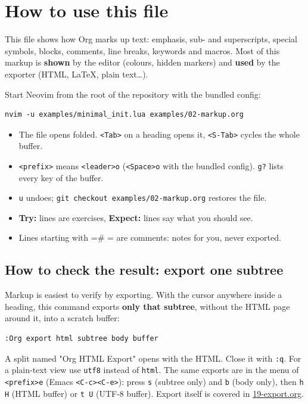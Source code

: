 \section{How to use this file}
\label{sec:orgba55d0f}
This file shows how Org marks up text: emphasis, sub- and superscripts,
special symbols, blocks, comments, line breaks, keywords and macros. Most of
this markup is \textbf{shown} by the editor (colours, hidden markers) and \textbf{used}
by the exporter (HTML, \LaTeX{}, plain text\ldots{}).

Start Neovim from the root of the repository with the bundled config:

\begin{verbatim}
nvim -u examples/minimal_init.lua examples/02-markup.org
\end{verbatim}

\begin{itemize}
\item The file opens folded. \texttt{<Tab>} on a heading opens it, \texttt{<S-Tab>} cycles
the whole buffer.
\item \texttt{<prefix>} means \texttt{<leader>o} (\texttt{<Space>o} with the bundled config). \texttt{g?}
lists every key of the buffer.
\item \texttt{u} undoes; \texttt{git checkout examples/02-markup.org} restores the file.
\item \textbf{Try:} lines are exercises, \textbf{Expect:} lines say what you should see.
\item Lines starting with =\# = are comments: notes for you, never exported.
\end{itemize}
\subsection{How to check the result: export one subtree}
\label{sec:org3ef3b96}
Markup is easiest to verify by exporting. With the cursor anywhere inside a
heading, this command exports \textbf{only that subtree}, without the HTML page
around it, into a scratch buffer:

\begin{verbatim}
:Org export html subtree body buffer
\end{verbatim}

A split named "Org HTML Export" opens with the HTML. Close it with \texttt{:q}.
For a plain-text view use \texttt{utf8} instead of \texttt{html}. The same exports are in
the menu of \texttt{<prefix>e} (Emacs \texttt{<C-c><C-e>}): press \texttt{s} (subtree only) and
\texttt{b} (body only), then \texttt{h H} (HTML buffer) or \texttt{t U} (UTF-8 buffer). Export
itself is covered in \href{19-export.org}{19-export.org}.

